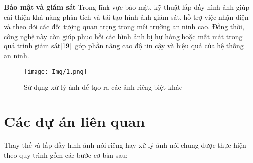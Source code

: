 \documentclass[12pt]{report}
\begin{document}
\textbf{Bảo mật và giám sát}
Trong lĩnh vực bảo mật, kỹ thuật lấp đầy hình ảnh giúp cải thiện khả năng phân tích và tái tạo hình ảnh giám sát, hỗ trợ việc nhận diện và theo dõi các đối tượng quan trọng trong môi trường an ninh cao. Đồng thời, công nghệ này còn giúp phục hồi các hình ảnh bị hư hỏng hoặc mất mát trong quá trình giám sát[19], góp phần nâng cao độ tin cậy và hiệu quả của hệ thống an ninh.\\


\vspace{1em}
\begin{figure}[H]
    \centering
    \texttt{[image: Img/1.png]}
    \caption{Sử dụng xử lý ảnh để tạo ra các ảnh riêng biệt khác}
    \label{fig:1.2}
\end{figure}
\vspace{0.5em}


\section{Các dự án liên quan}

Thay thế và lấp đầy hình ảnh nói riêng hay xử lý ảnh nói chung được thực hiện theo quy trình gồm các bước cơ bản sau:
\end{document}
